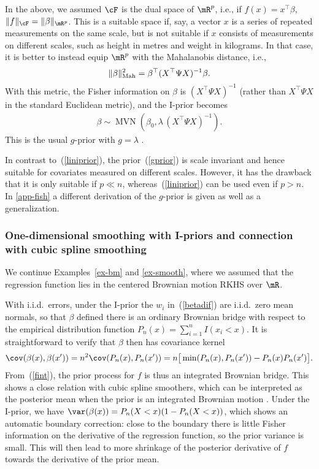 \documentclass[preprint,12pt,authoryear]{elsarticle}
\DeclarePairedDelimiter{\norm}{\lVert}{\rVert}
\DeclareMathOperator{\MVN}{MVN}
\begin{document}
In the above, we assumed $\cF$ is the dual space of $\mR^p$, i.e., if $f(x)=x^\top\beta$,
$\norm{f}_\cF = \norm{\beta}_{\mR^p}$.
This is a suitable space if, say, a vector $x$ is a series of repeated measurements on the same scale, but is not suitable if $x$ consists of measurements on different scales, such as height in metres and weight in kilograms. In that case, it is better to instead equip $\mR^p$ with the Mahalanobis distance, i.e.,
\[  \norm{\beta}_\text{Mah}^2=\beta^\top(X^\top\Psi X)^{-1}\beta . \]
With this metric, the Fisher information on $\beta$ is $(X^\top\Psi X)^{-1}$ (rather than $X^\top\Psi X$ in the standard Euclidean metric), and the I-prior becomes
\begin{align}\label{gprior}  \beta\sim\MVN(\beta_0,\lambda\,(X^\top\Psi X)^{-1}).   \end{align}
This is the usual $g$-prior with $g=\lambda$ \citep{zellner86}.


In contrast to~(\ref{liniprior}), the prior~(\ref{gprior}) is scale invariant and hence suitable for covariates measured on different scales. However, it has the drawback that it is only suitable if $p\ll n$, whereas~(\ref{liniprior}) can be used even if $p>n$.
In \ref{app-fish} a different derivation of the $g$-prior is given as well as a generalization. 




\subsubsection{One-dimensional smoothing with I-priors and connection with cubic spline smoothing}\label{ex-smooth2}

We continue Examples~\ref{ex-bm} and \ref{ex-smooth}, where we assumed that the regression function lies in the centered Brownian motion RKHS over $\mR$.


With i.i.d.\  errors, under the I-prior the $w_i$ in~(\ref{betadif}) are i.i.d.\  zero mean normals, 
so that $\beta$ defined there is an ordinary Brownian bridge with respect to the empirical distribution function $P_n(x)=\sum_{i=1}^nI(x_i<x)$. It is straightforward to verify that $\beta$ then has covariance kernel
\begin{align*}%
\cov(\beta(x),\beta(x')) = n^2\cov(P_n(x),P_n(x')) = n\big[\min(P_n(x),P_n(x'))-P_n(x)P_n(x')\big].
\end{align*}
From~(\ref{fint}), the prior process for $f$ is thus an integrated Brownian bridge. This shows a close relation with cubic spline smoothers, which can be interpreted as the posterior mean when the prior is an integrated Brownian motion
\citep[][Section~3.8.3]{wahba78,wahba90,gs94}.
Under the I-prior, we have $\var(\beta(x))=P_n(X<x)(1-P_n(X<x))$, which shows an automatic boundary correction: close to the boundary there is little Fisher information on the derivative of the regression function, so the prior variance is small. This will then lead to more shrinkage of the posterior derivative of $f$ towards the derivative of the prior mean.
\end{document}
